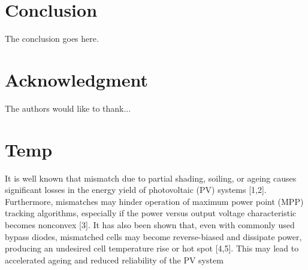 \documentclass[journal]{IEEEtran}
\begin{document}
\section{Conclusion}
The conclusion goes here.



\appendices
\section*{Acknowledgment}


The authors would like to thank...


\section*{Temp}
It is well known that mismatch due to partial shading, soiling, or ageing causes significant losses
in the energy yield of photovoltaic (PV) systems [1,2]. Furthermore, mismatches may hinder operation
of maximum power point (MPP) tracking algorithms, especially if the power versus output voltage
characteristic becomes nonconvex [3]. It has also been shown that, even with commonly used bypass
diodes, mismatched cells may become reverse-biased and dissipate power, producing an undesired
cell temperature rise or hot spot [4,5]. This may lead to accelerated ageing and reduced reliability of
the PV system




\end{document}
